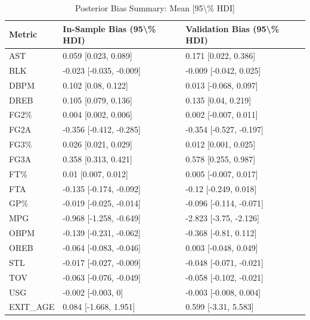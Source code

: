\begin{table}[t]
\caption*{
{\fontsize{20}{25}\selectfont  Posterior Bias Summary: Mean [95\textbackslash{}\% HDI]\fontsize{12}{15}\selectfont }
} 
\fontsize{12.0pt}{14.0pt}\selectfont
\begin{tabular*}{\linewidth}{@{\extracolsep{\fill}}lll}
\toprule
Metric & In-Sample Bias (95\textbackslash{}\% HDI) & Validation Bias (95\textbackslash{}\% HDI) \\ 
\midrule\addlinespace[2.5pt]
AST & 0.059 [0.023, 0.089] & 0.171 [0.022, 0.386] \\ 
BLK & -0.023 [-0.035, -0.009] & -0.009 [-0.042, 0.025] \\ 
DBPM & 0.102 [0.08, 0.122] & 0.013 [-0.068, 0.097] \\ 
DREB & 0.105 [0.079, 0.136] & 0.135 [0.04, 0.219] \\ 
FG2\% & 0.004 [0.002, 0.006] & 0.002 [-0.007, 0.011] \\ 
FG2A & -0.356 [-0.412, -0.285] & -0.354 [-0.527, -0.197] \\ 
FG3\% & 0.026 [0.021, 0.029] & 0.012 [0.001, 0.025] \\ 
FG3A & 0.358 [0.313, 0.421] & 0.578 [0.255, 0.987] \\ 
FT\% & 0.01 [0.007, 0.012] & 0.005 [-0.007, 0.017] \\ 
FTA & -0.135 [-0.174, -0.092] & -0.12 [-0.249, 0.018] \\ 
GP\% & -0.019 [-0.025, -0.014] & -0.096 [-0.114, -0.071] \\ 
MPG & -0.968 [-1.258, -0.649] & -2.823 [-3.75, -2.126] \\ 
OBPM & -0.139 [-0.231, -0.062] & -0.368 [-0.81, 0.112] \\ 
OREB & -0.064 [-0.083, -0.046] & 0.003 [-0.048, 0.049] \\ 
STL & -0.017 [-0.027, -0.009] & -0.048 [-0.071, -0.021] \\ 
TOV & -0.063 [-0.076, -0.049] & -0.058 [-0.102, -0.021] \\ 
USG & -0.002 [-0.003, 0] & -0.003 [-0.008, 0.004] \\ 
EXIT\_AGE & 0.084 [-1.668, 1.951] & 0.599 [-3.31, 5.583] \\ 
\bottomrule
\end{tabular*}
\end{table}

